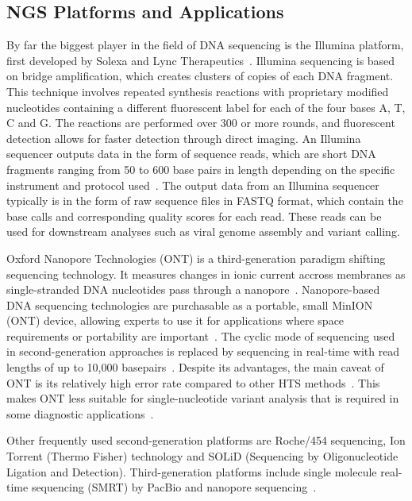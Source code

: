 \subsection{NGS Platforms and Applications}
By far the biggest player in the field of DNA sequencing is the Illumina platform, first developed by Solexa and Lync Therapeutics~\cite{illumina2015introduction}. Illumina sequencing is based on bridge amplification, which creates clusters of copies of each DNA fragment. This technique involves repeated synthesis reactions with proprietary modified nucleotides containing a different fluorescent label for each of the four bases A, T, C and G. The reactions are performed over 300 or more rounds, and fluorescent detection allows for faster detection through direct imaging. An Illumina sequencer outputs data in the form of sequence reads, which are short DNA fragments ranging from 50 to 600 base pairs in length depending on the specific instrument and protocol used~\cite{illumina2015introduction, slatko2018overview, mardis2008next}. The output data from an Illumina sequencer typically is in the form of raw sequence files in FASTQ format, which contain the base calls and corresponding quality scores for each read. These reads can be used for downstream analyses such as viral genome assembly and variant calling.

Oxford Nanopore Technologies (ONT) is a third-generation paradigm shifting sequencing technology. It measures changes in ionic current accross membranes as single-stranded DNA nucleotides pass through a nanopore~\cite{jain2016oxford}. Nanopore-based DNA sequencing technologies are purchasable as a portable, small MinION (ONT) device, allowing experts to use it for applications where space requirements or portability are important~\cite{greninger2015rapid, jain2016oxford}. The cyclic mode of sequencing used in second-generation approaches is replaced by sequencing in real-time with read lengths of up to 10,000 basepairs~\cite{jain2016oxford}. Despite its advantages, the main caveat of ONT is its relatively high error rate compared to other HTS methods~\cite{fu2019comparative}. This makes ONT less suitable for single-nucleotide variant analysis that is required in some diagnostic applications~\cite{bowden2019sequencing, stefan2022comparison}.

Other frequently used second-generation platforms are Roche/454 sequencing, Ion Torrent (Thermo Fisher) technology and SOLiD (Sequencing by Oligonucleotide Ligation and Detection). Third-generation platforms include single molecule real-time sequencing (SMRT) by PacBio and nanopore sequencing~\cite{rhoads2015pacbio}. 

